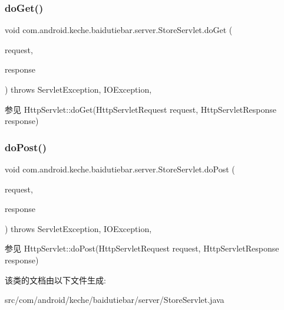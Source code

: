 \subsubsection{\texorpdfstring{do\+Get()}{doGet()}}
{\footnotesize\ttfamily void com.\+android.\+keche.\+baidutiebar.\+server.\+Store\+Servlet.\+do\+Get (\begin{DoxyParamCaption}\item[{Http\+Servlet\+Request}]{request,  }\item[{Http\+Servlet\+Response}]{response }\end{DoxyParamCaption}) throws Servlet\+Exception, I\+O\+Exception\hspace{0.3cm}{\ttfamily [inline]}, {\ttfamily [protected]}}

\begin{DoxySeeAlso}{参见}
Http\+Servlet\+::do\+Get(\+Http\+Servlet\+Request request, Http\+Servlet\+Response response) 
\end{DoxySeeAlso}
\mbox{\label{classcom_1_1android_1_1keche_1_1baidutiebar_1_1server_1_1_store_servlet_a033ebdbf83e2504fa7249f1ff94df27c}} 
\subsubsection{\texorpdfstring{do\+Post()}{doPost()}}
{\footnotesize\ttfamily void com.\+android.\+keche.\+baidutiebar.\+server.\+Store\+Servlet.\+do\+Post (\begin{DoxyParamCaption}\item[{Http\+Servlet\+Request}]{request,  }\item[{Http\+Servlet\+Response}]{response }\end{DoxyParamCaption}) throws Servlet\+Exception, I\+O\+Exception\hspace{0.3cm}{\ttfamily [inline]}, {\ttfamily [protected]}}

\begin{DoxySeeAlso}{参见}
Http\+Servlet\+::do\+Post(\+Http\+Servlet\+Request request, Http\+Servlet\+Response response) 
\end{DoxySeeAlso}


该类的文档由以下文件生成\+:\begin{DoxyCompactItemize}
\item 
src/com/android/keche/baidutiebar/server/Store\+Servlet.\+java\end{DoxyCompactItemize}
